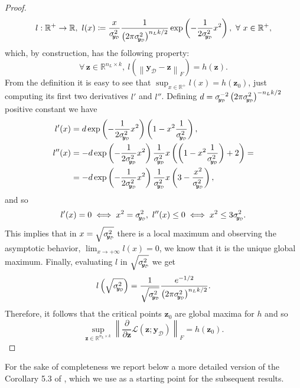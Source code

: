 \documentclass[a4paper, 11pt, reqno]{amsart}
\newcommand{\citet}[2][]{\citeauthor{#2} \cite[#1]{#2}}
\theoremstyle{plain}
\theoremstyle{remark}
\theoremstyle{definition}
\newcommand{\real}{\mathbb{R}}
\newcommand{\norm}[1]{\left\lVert#1\right\rVert}
\renewcommand{\exp}[1]{\operatorname{exp}\left(#1\right)}
\let\oldforall\forall
\renewcommand{\forall}{\oldforall\,}
\newcommand{\sigmay}{\sigma_{\scalebox{0.65}{$\kern-3pt\bm{y}_{\mathcal{D}}$}}}%
\begin{document}
\begin{proof}
	\begin{equation*}
		l: \real^+ \to \real, \ l(x) \coloneqq \frac{x}{\sigmay^2} \frac{1}{\left(2 \pi \sigmay^2\right)^{n_L k / 2}} \exp{-\frac{1}{2 \sigmay^2} x^2}, \ \forall x \in \real^+,
	\end{equation*}
	which, by construction, has the following property: 
	\begin{equation*}
		\forall \bm{z} \in \real^{n_L \times k}, \ l(\norm{\bm{y}_{\mathcal{D}} - \bm{z}}_F) = h(\bm{z}).
	\end{equation*}
	From the definition it is easy to see that $\sup_{x \in \real^+} l(x) = h(\bm{z}_0)$, just computing its first two derivatives $l'$ and $l''$. Defining $d = \sigmay^{-2} \left(2 \pi \sigmay^2\right)^{- n_L k / 2}$ positive constant we have
	\begin{align*}
		l'(x) & = d \exp{-\frac{1}{2\sigmay^2} x^2} \left(1 - x^2 \frac{1}{\sigmay^2}\right), \\
		l''(x) & = - d \exp{-\frac{1}{2\sigmay^2} x^2} \frac{1}{\sigmay^2} x \left(\left(1 - x^2 \frac{1}{\sigmay^2}\right) + 2\right) = \\
		& = - d \exp{-\frac{1}{2\sigmay^2} x^2} \frac{1}{\sigmay^2} x \left(3 - \frac{x^2}{\sigmay^2}\right),
	\end{align*}
	and so
	\begin{align*}
		l'(x) = 0 \iff x^2 = \sigmay^2, \ l''(x) \leq 0 \iff x^2 \leq 3 \sigmay^2.
	\end{align*}
	This implies that in $x = \sqrt{\sigmay^2}$ there is a local maximum and observing the asymptotic behavior, $\lim_{x \to +\infty} l(x) = 0$, we know that it is the unique global maximum. 
	Finally, evaluating $l$ in $\sqrt{\sigmay^2}$ we get 
	\begin{equation*}
		l\left(\sqrt{\sigmay^2}\right) = \frac{1}{\sqrt{\sigmay^2}} \frac{e^{- 1/2}}{\left(2 \pi \sigmay^2\right)^{n_L k / 2}}.
	\end{equation*}
	Therefore, it follows that the critical points $\bm{z}_0$ are global maxima for $h$ and so
	\begin{equation*}
		\sup_{\bm{z} \in \real^{n_L \times k}} \norm{\frac{\partial}{\partial \bm{z}} \mathcal{L}(\bm{z}; \bm{y}_{\mathcal{D}})}_F = h(\bm{z}_0).
	\end{equation*}
\end{proof}

For the sake of completeness we report below a more detailed version of the Corollary 5.3 of \citet{trevisan2023}, which we use as a starting point for the subsequent results.
\end{document}
